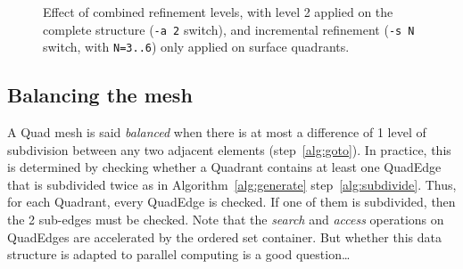 \documentclass[10pt]{article}
\begin{document}
\begin{figure}[htb]
{  \label{f:pierefs5}
 }
\centering
 \caption{Effect of combined refinement levels, with level 2 applied on the complete structure (\texttt{-a 2} switch), and incremental refinement (\texttt{-s N} switch, with \texttt{N=3..6}) only applied on surface quadrants.}
\label{fig:pierefs}
\end{figure}

\subsection{Balancing the mesh}
A Quad mesh is said \textit{balanced} when there is at most a difference of 1 level of subdivision between any two adjacent elements (step~\ref{alg:goto}). In practice, this is determined by checking whether a Quadrant contains at least one QuadEdge that is subdivided twice as in Algorithm~\ref{alg:generate} step~\ref{alg:subdivide}. Thus, for each Quadrant, every QuadEdge is checked. If one of them is subdivided, then the 2 sub-edges must be checked. Note that the \textit{search} and \textit{access} operations on QuadEdges are accelerated by the ordered set container. But whether this data structure is adapted to parallel computing is a good question\ldots
\end{document}

